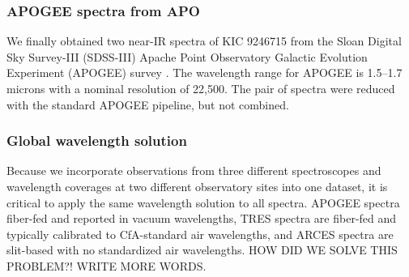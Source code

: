 \subsubsection{APOGEE spectra from APO}\label{apogee}
We finally obtained two near-IR spectra of KIC 9246715 from the Sloan Digital Sky Survey-III (SDSS-III) Apache Point Observatory Galactic Evolution Experiment (APOGEE) survey \citep{2015arXiv150100963A}. The wavelength range for APOGEE is 1.5--1.7 microns with a nominal resolution of 22,500. The pair of spectra were reduced with the standard APOGEE pipeline, but not combined.

\subsubsection{Global wavelength solution}\label{wavelength}
Because we incorporate observations from three different spectroscopes and wavelength coverages at two different observatory sites into one dataset, it is critical to apply the same wavelength solution to all spectra. APOGEE spectra fiber-fed and reported in vacuum wavelengths, TRES spectra are fiber-fed and typically calibrated to CfA-standard air wavelengths, and ARCES spectra are slit-based with no standardized air wavelengths. HOW DID WE SOLVE THIS PROBLEM?! WRITE MORE WORDS.